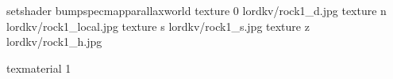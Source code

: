 setshader bumpspecmapparallaxworld
texture 0 lordkv/rock1_d.jpg
texture n lordkv/rock1_local.jpg
texture s lordkv/rock1_s.jpg
texture z lordkv/rock1_h.jpg

texmaterial 1

